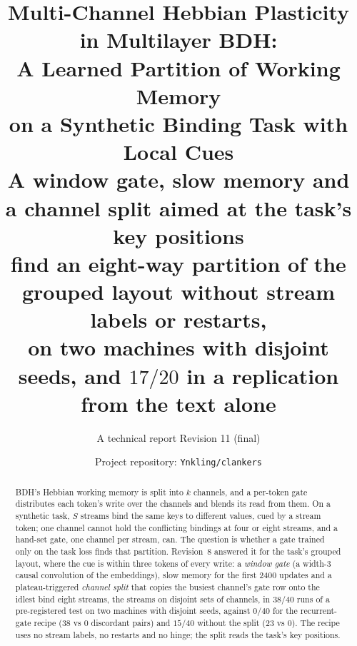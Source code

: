 \documentclass[11pt]{article}
\title{\vspace{-2.5em}\bfseries Multi-Channel Hebbian Plasticity in Multilayer BDH:\\
A Learned Partition of Working Memory\\ on a Synthetic Binding Task with Local Cues\\[0.3em]
\large\normalfont A window gate, slow memory and a channel split aimed at the task's key positions\\ find an eight-way partition of the grouped layout without stream labels or restarts,\\ on two machines with disjoint seeds, and $17/20$ in a replication from the text alone}
\author{A technical report \quad\textbullet\quad Revision 11 (final)}
\date{Project repository: \texttt{Ynkling/clankers}}
\begin{document}
\maketitle
\vspace{-1.5em}

\begin{abstract}
BDH's Hebbian working memory is split into $k$ channels, and a per-token gate distributes each token's write over the channels and blends its read from them. On a synthetic task, $S$ streams bind the same keys to different values, cued by a stream token; one channel cannot hold the conflicting bindings at four or eight streams, and a hand-set gate, one channel per stream, can. The question is whether a gate trained only on the task loss finds that partition. Revision~8 answered it for the task's grouped layout, where the cue is within three tokens of every write: a \emph{window gate} (a width-3 causal convolution of the embeddings), slow memory for the first 2400 updates and a plateau-triggered \emph{channel split} that copies the busiest channel's gate row onto the idlest bind eight streams, the streams on disjoint sets of channels, in $38/40$ runs of a pre-registered test on two machines with disjoint seeds, against $0/40$ for the recurrent-gate recipe (38 vs 0 discordant pairs) and $15/40$ without the split (23 vs 0). The recipe uses no stream labels, no restarts and no hinge; the split reads the task's key positions.


\end{abstract}
\end{document}
